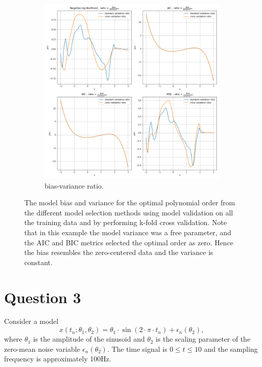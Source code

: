 \documentclass{article}
\begin{document}
\begin{figure}[!htb]
     \begin{subfigure}[b]{0.45\textwidth}
         \centering
         \includegraphics[width=\textwidth]{Q2b_fig5.png}
         \caption{bias-variance ratio.}
     \end{subfigure}
        \caption{The model bias and variance for the optimal polynomial order from the different model selection methods using model validation on all the training data and by performing k-fold cross validation. Note that in this example the model variance was a free parameter, and the AIC and BIC metrics selected the optimal order as zero. Hence the bias resembles the zero-centered data and the variance is constant.}
        \label{fig:Q2b_3}
\end{figure}

\clearpage

\section{Question 3}

Consider a model 
\begin{equation}
x(t_n;\theta_1, \theta_2) = \theta_1 \cdot \sin \left(2\cdot\pi\cdot t_n\right) + \epsilon_n(\theta_2),
\end{equation}
where $\theta_1$ is the amplitude of the sinusoid and $\theta_2$ is the scaling parameter of the zero-mean noise variable $\epsilon_n(\theta_2)$. The time signal is $0 \leq t \leq 10$ and the sampling frequency is approximately 100Hz.
\end{document}
